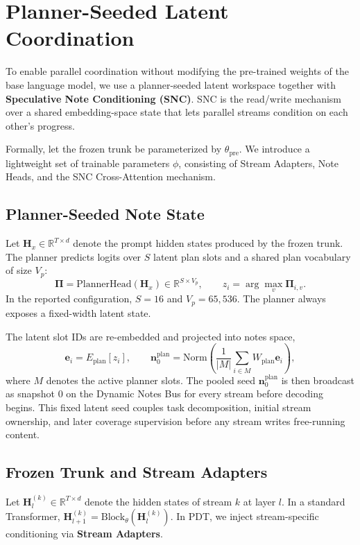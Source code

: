\section{Planner-Seeded Latent Coordination}
\label{sec:snc}

To enable parallel coordination without modifying the pre-trained weights of the base language model, we use a planner-seeded latent workspace together with \textbf{Speculative Note Conditioning (SNC)}. SNC is the read/write mechanism over a shared embedding-space state that lets parallel streams condition on each other's progress.

Formally, let the frozen trunk be parameterized by $\theta_{\text{pre}}$. We introduce a lightweight set of trainable parameters $\phi$, consisting of Stream Adapters, Note Heads, and the SNC Cross-Attention mechanism.

\subsection{Planner-Seeded Note State}
Let $\mathbf{H}_x \in \mathbb{R}^{T \times d}$ denote the prompt hidden states produced by the frozen trunk. The planner predicts logits over $S$ latent plan slots and a shared plan vocabulary of size $V_p$:
\begin{equation}
    \mathbf{\Pi} = \mathrm{PlannerHead}(\mathbf{H}_x) \in \mathbb{R}^{S \times V_p}, \qquad
    z_i = \arg\max_v \mathbf{\Pi}_{i,v}.
\end{equation}
In the reported configuration, $S=16$ and $V_p=65{,}536$. The planner always exposes a fixed-width latent state.

The latent slot IDs are re-embedded and projected into notes space,
\begin{equation}
    \mathbf{e}_i = E_{\text{plan}}[z_i], \qquad
    \mathbf{n}^{\text{plan}}_0 = \mathrm{Norm}\!\left(\frac{1}{|M|} \sum_{i \in M} W_{\text{plan}} \mathbf{e}_i\right),
\end{equation}
where $M$ denotes the active planner slots. The pooled seed $\mathbf{n}^{\text{plan}}_0$ is then broadcast as snapshot 0 on the Dynamic Notes Bus for every stream before decoding begins.
This fixed latent seed couples task decomposition, initial stream ownership, and later coverage supervision before any stream writes free-running content.

\subsection{Frozen Trunk and Stream Adapters}
Let $\mathbf{H}^{(k)}_l \in \mathbb{R}^{T \times d}$ denote the hidden states of stream $k$ at layer $l$. In a standard Transformer, $\mathbf{H}^{(k)}_{l+1} = \text{Block}_{\theta}(\mathbf{H}^{(k)}_l)$. In PDT, we inject stream-specific conditioning via \textbf{Stream Adapters}.

